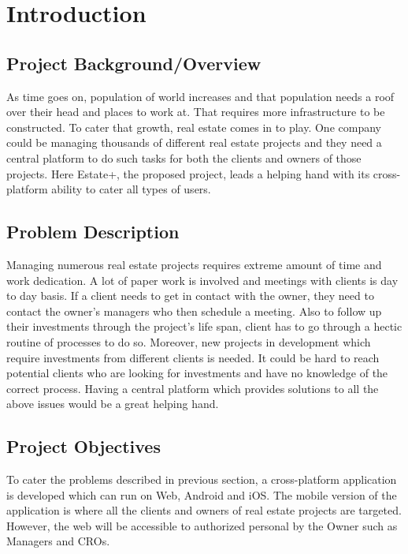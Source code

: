 \chapter{Introduction} \label{chap:intro}


\section*{}
\section{Project Background/Overview}
As time goes on, population of world increases and that population needs a roof over their head and places to work at. That requires more infrastructure to be constructed. To cater that growth, real estate comes in to play. One company could be managing thousands of different real estate projects and they need a central platform to do such tasks for both the clients and owners of those projects. Here Estate+, the proposed project, leads a helping hand with its cross-platform ability to cater all types of users.
\section{Problem Description}
Managing numerous real estate projects requires extreme amount of time and work dedication. A lot of paper work is involved and meetings with clients is day to day basis. If a client needs to get in contact with the owner, they need to contact the owner's managers who then schedule a meeting. Also to follow up their investments through the project's life span, client has to go through a hectic routine of processes to do so. Moreover, new projects in development which require investments from different clients is needed. It could be hard to reach potential clients who are looking for investments and have no knowledge of the correct process. Having a central platform which provides solutions to all the above issues would be a great helping hand.
\section{Project Objectives}
To cater the problems described in previous section, a cross-platform application is developed which can run on Web, Android and iOS. The mobile version of the application is where all the clients and owners of real estate projects are targeted. However, the web will be accessible to authorized personal by the Owner such as Managers and CROs.
